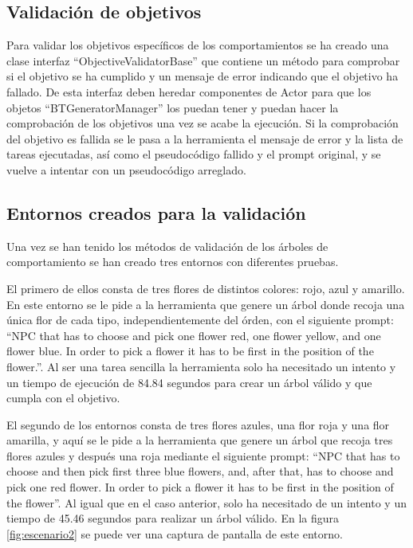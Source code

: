 \subsection{Validación de objetivos}
Para validar los objetivos específicos de los comportamientos se ha creado una clase interfaz ``ObjectiveValidatorBase'' que contiene un método para comprobar si el objetivo se ha cumplido y un mensaje de error indicando que el objetivo ha fallado.
De esta interfaz deben heredar componentes de Actor para que los objetos ``BTGeneratorManager'' los puedan tener y puedan hacer la comprobación de los objetivos una vez se acabe la ejecución.
Si la comprobación del objetivo es fallida se le pasa a la herramienta el mensaje de error y la lista de tareas ejecutadas, así como el pseudocódigo fallido y el prompt original, y se vuelve a intentar con un pseudocódigo arreglado.

\subsection{Entornos creados para la validación}
Una vez se han tenido los métodos de validación de los árboles de comportamiento se han creado tres entornos con diferentes pruebas.

El primero de ellos consta de tres flores de distintos colores: rojo, azul y amarillo.
En este entorno se le pide a la herramienta que genere un árbol donde recoja una única flor de cada tipo, independientemente del órden, con el siguiente prompt: ``NPC that has to choose and pick one flower red, one flower yellow, and one flower blue. In order to pick a flower it has to be first in the position of the flower.''.
Al ser una tarea sencilla la herramienta solo ha necesitado un intento y un tiempo de ejecución de 84.84 segundos para crear un árbol válido y que cumpla con el objetivo.

El segundo de los entornos consta de tres flores azules, una flor roja y una flor amarilla, y aquí se le pide a la herramienta que genere un árbol que recoja tres flores azules y después una roja mediante el siguiente prompt: ``NPC that has to choose and then pick first three blue flowers, and, after that, has to choose and pick one red flower. In order to pick a flower it has to be first in the position of the flower''.
Al igual que en el caso anterior, solo ha necesitado de un intento y un tiempo de 45.46 segundos para realizar un árbol válido.
En la figura \ref{fig:escenario2} se puede ver una captura de pantalla de este entorno.

